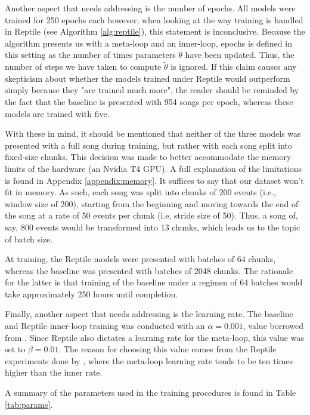 \documentclass[a4paper]{book}
\begin{document}
Another aspect that needs addressing is the number of epochs. All models were trained for 250 epochs each however, when looking at the way training is handled in Reptile (see Algorithm \ref{alg:reptile}), this statement is inconclusive. Because the algorithm presents us with a meta-loop and an inner-loop, epochs is defined in this setting as the number of times parameters $\theta$ have been updated. Thus, the number of steps we have taken to compute $\tilde \theta$ is ignored. If this claim causes any skepticism about whether the models trained under Reptile would outperform simply because they "are trained much more", the reader should be reminded by the fact that the baseline is presented with 954 songs per epoch, whereas these models are trained with five.

With these in mind, it should be mentioned that neither of the three models was presented with a full song during training, but rather with each song split into fixed-size chunks. This decision was made to better accommodate the memory limits of the hardware (an Nvidia T4 GPU). A full explanation of the limitations is found in Appendix \ref{appendix:memory}. It suffices to say that our dataset won't fit in memory. As such, each song was split into chunks of 200 events (i.e., window size of 200), starting from the beginning and moving towards the end of the song at a rate of 50 events per chunk (i.e, stride size of 50). Thus, a song of, say, 800 events would be transformed into 13 chunks, which leads us to the topic of batch size.

At training, the Reptile models were presented with batches of 64 chunks, whereas the baseline was presented with batches of 2048 chunks. The rationale for the latter is that training of the baseline under a regimen of 64 batches would take approximately 250 hours until completion.

Finally, another aspect that needs addressing is the learning rate. The baseline and Reptile inner-loop training was conducted with an $\alpha = 0.001$, value borrowed from \textcite{oore_this_2018}. Since Reptile also dictates a learning rate for the meta-loop, this value was set to $\beta = 0.01$. The reason for choosing this value comes from the Reptile experiments done by \textcite{nichol_first-order_2018}, where the meta-loop learning rate tends to be ten times higher than the inner rate. 

A summary of the parameters used in the training procedures is found in Table \ref{tab:params}.
\end{document}
